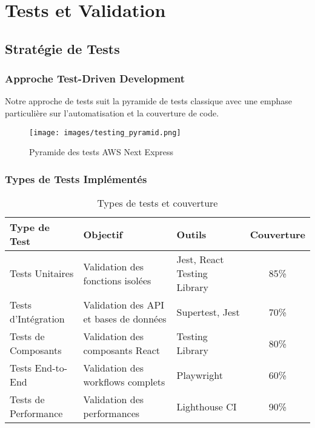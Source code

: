 \chapter{Tests et Validation}

\section{Stratégie de Tests}

\subsection{Approche Test-Driven Development}

Notre approche de tests suit la pyramide de tests classique avec une emphase particulière sur l'automatisation et la couverture de code.

\begin{figure}[H]
    \centering
    \texttt{[image: images/testing\_pyramid.png]}
    \caption{Pyramide des tests AWS Next Express}
    \label{fig:testing_pyramid}
\end{figure}

\subsection{Types de Tests Implémentés}

\begin{table}[H]
    \centering
    \begin{tabularx}{\textwidth}{|l|X|X|c|}
        \hline
        \textbf{Type de Test} & \textbf{Objectif} & \textbf{Outils} & \textbf{Couverture} \\
        \hline
        Tests Unitaires & Validation des fonctions isolées & Jest, React Testing Library & 85\% \\
        \hline
        Tests d'Intégration & Validation des API et bases de données & Supertest, Jest & 70\% \\
        \hline
        Tests de Composants & Validation des composants React & Testing Library & 80\% \\
        \hline
        Tests End-to-End & Validation des workflows complets & Playwright & 60\% \\
        \hline
        Tests de Performance & Validation des performances & Lighthouse CI & 90\% \\
        \hline
    \end{tabularx}
    \caption{Types de tests et couverture}
    \label{tab:test_types}
\end{table}

